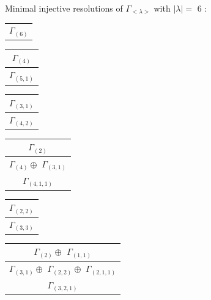 \documentclass[main.tex]{subfiles}
\begin{document}
\bigskip
Minimal injective resolutions of $\Gamma_{<\lambda>}$ with $|\lambda| = $ 6 : \\
\begin{minipage}{.2\textwidth}
\centering
\begin{tabular}{c}
$\Gamma_{(
6
)}$
\\
\end{tabular}\end{minipage}
\begin{minipage}{.2\textwidth}
\centering
\begin{tabular}{c}
$\Gamma_{(
4
)}$
\\ \hline
$\Gamma_{(
5 , 
1
)}$
\\
\end{tabular}\end{minipage}
\begin{minipage}{.2\textwidth}
\centering
\begin{tabular}{c}
$\Gamma_{(
3 , 
1
)}$
\\ \hline
$\Gamma_{(
4 , 
2
)}$
\\
\end{tabular}\end{minipage}
\begin{minipage}{.2\textwidth}
\centering
\begin{tabular}{c}
$\Gamma_{(
2
)}$
\\ \hline
$\Gamma_{(
4
)} \oplus$
$\Gamma_{(
3 , 
1
)}$
\\ \hline
$\Gamma_{(
4 , 
1 , 
1
)}$
\\
\end{tabular}\end{minipage}
\begin{minipage}{.2\textwidth}
\centering
\begin{tabular}{c}
$\Gamma_{(
2 , 
2
)}$
\\ \hline
$\Gamma_{(
3 , 
3
)}$
\\
\end{tabular}\end{minipage}
\bigskip
\begin{minipage}{.3\textwidth}
\centering
\begin{tabular}{c}
$\Gamma_{(
2
)} \oplus$
$\Gamma_{(
1 , 
1
)}$
\\ \hline
$\Gamma_{(
3 , 
1
)} \oplus$
$\Gamma_{(
2 , 
2
)} \oplus$
$\Gamma_{(
2 , 
1 , 
1
)}$
\\ \hline
$\Gamma_{(
3 , 
2 , 
1
)}$
\\
\end{tabular}\end{minipage}
\end{document}
